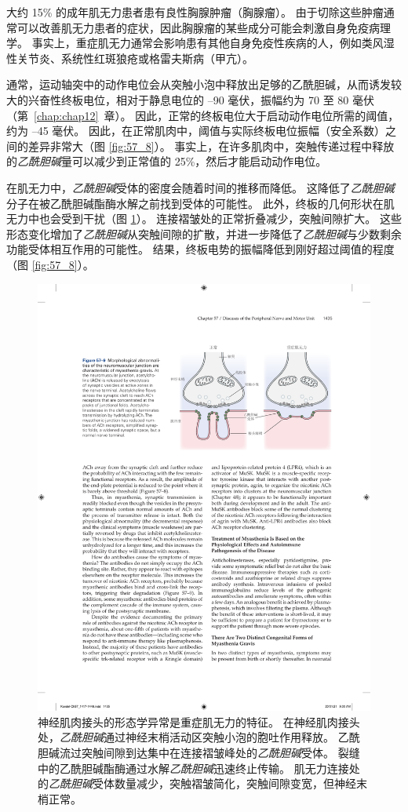 大约 15\% 的成年肌无力患者患有良性胸腺肿瘤（胸腺瘤）。
由于切除这些肿瘤通常可以改善肌无力患者的症状，因此胸腺瘤的某些成分可能会刺激自身免疫病理学。
事实上，重症肌无力通常会影响患有其他自身免疫性疾病的人，例如类风湿性关节炎、系统性红斑狼疮或格雷夫斯病（甲亢）。


通常，运动轴突中的动作电位会从突触小泡中释放出足够的乙酰胆碱，从而诱发较大的兴奋性终板电位，相对于静息电位的 –90 毫伏，振幅约为 70 至 80 毫伏（第~\ref{chap:chap12}~章）。
因此，正常的终板电位大于启动动作电位所需的阈值，约为 –45 毫伏。
因此，在正常肌肉中，阈值与实际终板电位振幅（安全系数）之间的差异非常大（图 \ref{fig:57_8}）。
事实上，在许多肌肉中，突触传递过程中释放的\textit{乙酰胆碱}量可以减少到正常值的 25\%，然后才能启动动作电位。


在肌无力中，\textit{乙酰胆碱}受体的密度会随着时间的推移而降低。
这降低了\textit{乙酰胆碱}分子在被乙酰胆碱酯酶水解之前找到受体的可能性。
此外，终板的几何形状在肌无力中也会受到干扰（图 \ref{fig:57_9}）。
连接褶皱处的正常折叠减少，突触间隙扩大。
这些形态变化增加了\textit{乙酰胆碱}从突触间隙的扩散，并进一步降低了\textit{乙酰胆碱}与少数剩余功能受体相互作用的可能性。
结果，终板电势的振幅降低到刚好超过阈值的程度（图 \ref{fig:57_8}）。


\begin{figure}[htbp]
	\centering
	\includegraphics[width=0.75\linewidth]{chap57/fig_57_9}
	\caption{神经肌肉接头的形态学异常是重症肌无力的特征。
		在神经肌肉接头处，\textit{乙酰胆碱}通过神经末梢活动区突触小泡的胞吐作用释放。
		乙酰胆碱流过突触间隙到达集中在连接褶皱峰处的\textit{乙酰胆碱}受体。
		裂缝中的乙酰胆碱酯酶通过水解\textit{乙酰胆碱}迅速终止传输。
		肌无力连接处的\textit{乙酰胆碱}受体数量减少，突触褶皱简化，突触间隙变宽，但神经末梢正常。}
	\label{fig:57_9}
\end{figure}


